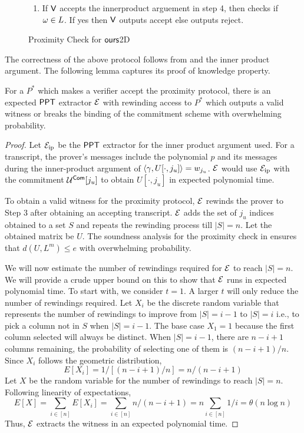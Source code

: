 \begin{figure}[h!]
\begin{framed}
\begin{enumerate}
			\item If $\mathsf{V}$ accepts the innerproduct arguement in step 4, then checks if $\omega\in L$. If yes then $\mathsf{V}$ outputs accept else outputs reject.
			\end{enumerate}
		\end{framed}
	\caption{Proximity Check for $\textsf{ours}$2D}
	\end{figure}
The correctness of the above protocol follows from \cite{ligero} and the inner product argument. The following lemma captures its proof of knowledge property.
\begin{lemma}\label{lem:proximity}
For a $P^*$ which makes a verifier accept the proximity protocol, there is an expected $\mathsf{PPT}$ extractor $\mathcal{E}$ with rewinding access to $P^*$ which outputs a valid witness or breaks the binding of the commitment scheme with overwhelming probability.
\end{lemma}
\begin{proof}
Let $\mathcal{E}_{\mathrm{ip}}$ be the $\mathsf{PPT}$ extractor for the inner product argument used. For a transcript, the prover's messages include the polynomial $p$ and its messages during the inner-product argument of $\langle \gamma,U[\cdot, j_u]\rangle = w_{j_u}$.
$\mathcal{E}$ would use $\mathcal{E}_{\mathrm{ip}}$ with the commitment $\mathcal{U}^{\mathsf{Com}}[j_u]$ to obtain $U[\cdot,j_u]$ in expected polynomial time. 

To obtain a valid witness for the proximity protocol, $\mathcal{E}$ rewinds the prover to Step 3 after obtaining an accepting transcript. $\mathcal{E}$ adds the set of $j_u$ indices obtained to a set $S$ and repeats the rewinding process till $|S| = n$. Let the obtained matrix be $U$.
The soundness analysis for the proximity check in \cite{ligero} ensures that  $d(U, L^m) \leq e$ with overwhelming probability. 

We will now estimate the number of rewindings required for $\mathcal{E}$ to reach $|S| = n$. We will provide a crude upper bound on this to show that $\mathcal{E}$ runs in expected polynomial time. To start with, we consider $t=1$. A larger $t$ will only reduce the number of rewindings required. Let $X_i$ be the discrete random variable that represents the number of rewindings to improve from $|S| = i-1$ to $|S| = i$ i.e., to pick a column not in $S$ when $|S| = i-1$. The base case $X_1=1$ because the first column selected will always be distinct. When $|S| = i-1$, there are $n-i+1$ columns remaining, the probability of selecting one of them is $(n-i+1)/n$. Since $X_i$ follows the geometric distribution, 
\[
E[X_i] = 1/ [(n-i+1)/n] = n/ (n-i+1)
\]
Let $X$ be the random variable for the number of rewindings to reach $|S| = n$.
Following linearity of expectations, 
\[
E[X] = \sum_{i \in [n]} E[X_i] = \sum_{i \in [n]} n/ (n-i+1) = n \sum_{i \in [n]} 1/i = \theta (n \log n) 
\]
Thus, $\mathcal{E}$ extracts the witness in an expected polynomial time.
\end{proof}

